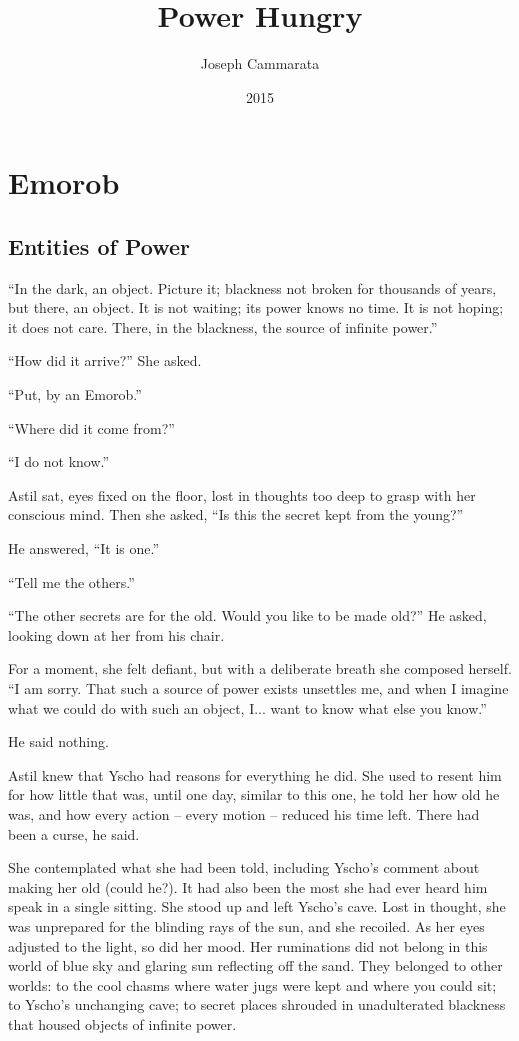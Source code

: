 \documentclass[12pt]{book}
\author{Joseph Cammarata}
\title{Power Hungry}
\date{2015}
\begin{document}
\maketitle

\chapter{Emorob}
\section{Entities of Power}

``In the dark, an object.  Picture it; blackness not broken for thousands of years, but there, an object.  It is not waiting; its power knows no time.  It is not hoping; it does not care.  There, in the blackness, the source of infinite power.''

``How did it arrive?'' She asked.

``Put, by an Emorob.''

``Where did it come from?''

``I do not know.''

Astil sat, eyes fixed on the floor, lost in thoughts too deep to grasp with her conscious mind. Then she asked, ``Is this the secret kept from the young?''

He answered, ``It is one.''

``Tell me the others.'' 

``The other secrets are for the old.  Would you like to be made old?'' He asked, looking down at her from his chair.

For a moment, she felt defiant, but with a deliberate breath she composed herself.  ``I am sorry.  That such a source of power exists unsettles me, and when I imagine what we could do with such an object, I...  want to know what else you know.''

He said nothing.

Astil knew that Yscho had reasons for everything he did.  She used to resent him for how little that was, until one day, similar to this one, he told her how old he was, and how every action -- every motion -- reduced his time left.  There had been a curse, he said. 

She contemplated what she had been told, including Yscho's comment about making her old (could he?).  It had also been the most she had ever heard him speak in a single sitting. She stood up and left Yscho's cave.  Lost in thought, she was unprepared for the blinding rays of the sun, and she recoiled.  As her eyes adjusted to the light, so did her mood.  Her ruminations did not belong in this world of blue sky and glaring sun reflecting off the sand.  They belonged to other worlds: to the cool chasms where water jugs were kept and where you could sit; to Yscho's unchanging cave; to secret places shrouded in unadulterated blackness that housed objects of infinite power.  
\end{document}
